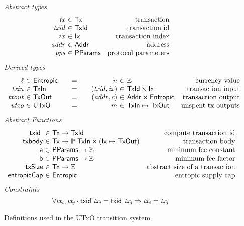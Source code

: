 \begin{figure*}[htb]
  \emph{Abstract types}
  \begin{equation*}
    \begin{array}{r@{~\in~}lr}
      \var{tx} & \Tx & \text{transaction}\\
      \var{txid} & \TxId & \text{transaction id}\\
      ix & \Ix & \text{transaction index}\\
      \var{addr} & \Addr & \text{address}\\
      \var{pps} & \PPMMap & \text{protocol parameters}
    \end{array}
  \end{equation*}
  \emph{Derived types}
  \begin{equation*}
    \begin{array}{r@{~\in~}l@{\qquad=\qquad}r@{~\in~}lr}
      \ell & \Entropic
      & n  & \mathbb{Z}
      & \text{currency value}
      \\
      \var{txin}
      & \TxIn
      & (\var{txid}, \var{ix})
      & \TxId \times \Ix
      & \text{transaction input}
      \\
      \var{txout}
      & \type{TxOut}
      & (\var{addr}, c)
      & \Addr \times \Entropic
      & \text{transaction output}
      \\
      \var{utxo}
      & \UTxO
      & m
      & \TxIn \mapsto \TxOut
      & \text{unspent tx outputs}
    \end{array}
  \end{equation*}
  \emph{Abstract Functions}
  \begin{equation*}
    \begin{array}{r@{~\in~}lr}
      \txid{} & \Tx \to \TxId & \text{compute transaction id}\\
      \fun{txbody} & \Tx \to \powerset{\TxIn} \times (\Ix \mapsto \TxOut)
                                  & \text{transaction body}\\
      \fun{a} & \PPMMap \to \mathbb{Z} & \text{minimum fee constant}\\
      \fun{b} & \PPMMap \to \mathbb{Z} & \text{minimum fee factor}\\
      \fun{txSize} & \Tx \to \mathbb{Z} & \text{abstract size of a transaction}\\
      \fun{entropicCap} & \Entropic & \text{entropic supply cap}
    \end{array}
  \end{equation*}
  \emph{Constraints}
  \begin{equation}
    \label{eq:txid-injective}
    \forall \mathit{tx_i}, \mathit{tx_j} \cdot
    \mathsf{txid}~ \mathit{\mathit{tx_i}} = \mathsf{txid}~ \mathit{\mathit{tx_j}} \Rightarrow \mathit{tx_i} = \mathit{tx_j}
  \end{equation}
  \caption{Definitions used in the UTxO transition system}
  \label{fig:defs:utxo}
\end{figure*}

